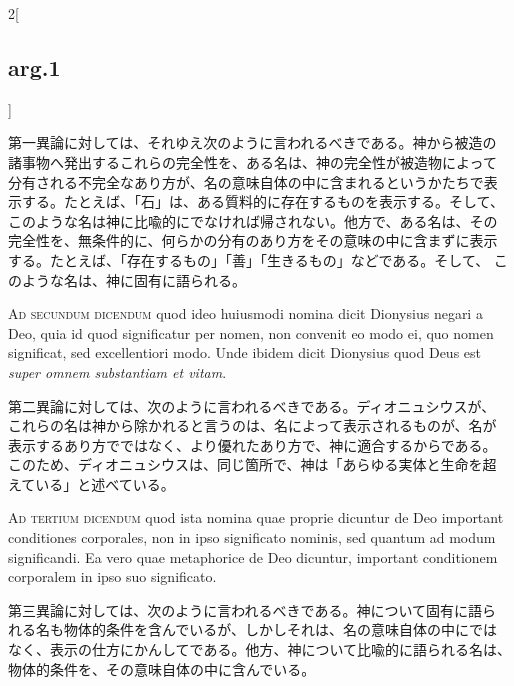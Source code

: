 \documentclass[paper=a4paper,fontsize=10pt,jafontsize=9pt,titlepage]{jlreq}
\begin{document}
\begin{paracol}{2}[\subsection{arg.1}]
\switchcolumn

第一異論に対しては、それゆえ次のように言われるべきである。神から被造の
諸事物へ発出するこれらの完全性を、ある名は、神の完全性が被造物によって
分有される不完全なあり方が、名の意味自体の中に含まれるというかたちで表
示する。たとえば、「石」は、ある質料的に存在するものを表示する。そして、
このような名は神に比喩的にでなければ帰されない。他方で、ある名は、その
完全性を、無条件的に、何らかの分有のあり方をその意味の中に含まずに表示
する。たとえば、「存在するもの」「善」「生きるもの」などである。そして、
このような名は、神に固有に語られる。

\switchcolumn*[\subsection{ad.2}]

{\scshape Ad secundum dicendum} quod ideo huiusmodi nomina dicit Dionysius
negari a Deo, quia id quod significatur per nomen, non convenit eo
modo ei, quo nomen significat, sed excellentiori modo. Unde ibidem
dicit Dionysius quod Deus est {\itshape super omnem substantiam et vitam}.

\switchcolumn

第二異論に対しては、次のように言われるべきである。ディオニュシウスが、
これらの名は神から除かれると言うのは、名によって表示されるものが、名が
表示するあり方でではなく、より優れたあり方で、神に適合するからである。
このため、ディオニュシウスは、同じ箇所で、神は「あらゆる実体と生命を超
えている」と述べている。

\switchcolumn*[\subsection{ad.3}]

{\scshape Ad tertium dicendum} quod ista nomina quae proprie dicuntur de
Deo important conditiones corporales, non in ipso significato nominis,
sed quantum ad modum significandi. Ea vero quae metaphorice de Deo
dicuntur, important conditionem corporalem in ipso suo significato.

\switchcolumn

第三異論に対しては、次のように言われるべきである。神について固有に語ら
れる名も物体的条件を含んでいるが、しかしそれは、名の意味自体の中にでは
なく、表示の仕方にかんしてである。他方、神について比喩的に語られる名は、
物体的条件を、その意味自体の中に含んでいる。

\end{paracol}
\end{document}
